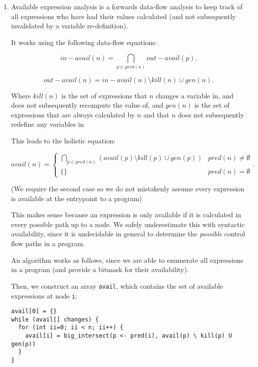 

\begin{enumerate}[label=(\alph*)]
    \item
        Available expression analysis is a forwards data-flow analysis to keep track of all expressions who have had their values calculated (and not subsequently invalidated by a variable re-definition).

        It works using the following data-flow equations:

        \[
            in-avail(n) = \bigcap_{p \in pred(n)} out-avail(p)
        .\] 

        \[
            out-avail(n) = in-avail(n) \setminus kill(n) \cup gen(n)
        .\] 

        Where $kill(n)$ is the set of expressions that $n$ changes a variable in, and does not subsequently recompute the value of, and $gen(n)$ is the set of expressions that are always calculated by $n$ and that $n$ does not subsequently redefine any variables in

        This leads to the holistic equation:

        \[
            avail(n) = \begin{cases}\bigcap_{p \in pred(n)} (avail(p) \setminus kill(p) \cup gen(p)) & pred(n) \neq \emptyset \\ \{\} & pred(n) = \emptyset\end{cases}
        .\] 

        (We require the second case so we do not mistakenly assume every expression is available at the entrypoint to a program)

        This makes sense because an expression is only available if it is calculated in every possible path up to a node. We safely underestimate this with syntactic availability, since it is undecidable in general to determine the \textit{possible} control flow paths in a program.

        An algorithm works as follows, since we are able to enumerate all expressions in a program (and provide a bitmask for their availability).

        Then, we construct an array \texttt{avail}, which contains the set of available expressions at node \texttt{i}:

\begin{verbatim}
avail[0] = {}
while (avail[] changes) {
  for (int ii=0; ii < n; ii++) {
    avail[i] = big_intersect(p <- pred(i), avail(p) \ kill(p) U gen(p))
  }
}
\end{verbatim}


\end{enumerate}
